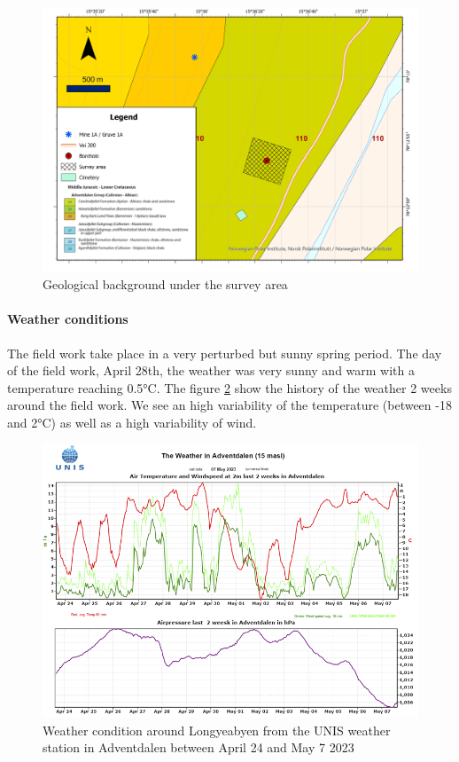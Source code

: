\begin{figure}
    \centering
    \includegraphics[width=\linewidth]{Images/00_Methodology/GeologicalSituationMap.jpg}
    \caption{Geological background under the survey area \cite{Atakan2015GeoscienceSvalbard}}
    \label{fig:GeologicalBackground}
\end{figure}

\paragraph{Weather conditions} The field work take place in a very perturbed but sunny spring period. The day of the field work, April 28th, the weather was very sunny and warm with a temperature reaching 0.5°C. The figure \ref{fig:weather} show the history of the weather 2 weeks around the field work. We see an high variability of the temperature (between -18 and 2°C) as well as a high variability of wind.

\begin{figure}
    \centering
    \includegraphics[width=\linewidth]{Images/00_Methodology/WeatherConditions.png}
    \caption{Weather condition around Longyeabyen from the UNIS weather station in Adventdalen between April 24 and May 7 2023}
    \label{fig:weather}
\end{figure}

